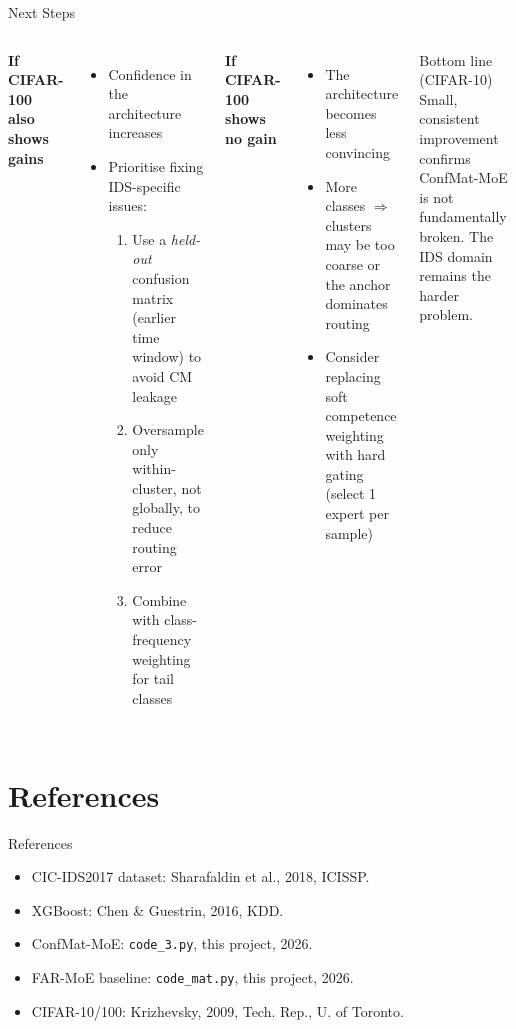 \documentclass[aspectratio=169,10pt]{beamer}
\begin{document}
\begin{frame}{Next Steps}
  \begin{columns}[T]
      \textbf{If CIFAR-100 also shows gains}
      \begin{itemize}\itemsep4pt
        \item Confidence in the architecture increases
        \item Prioritise fixing IDS-specific issues:
          \begin{enumerate}
            \item Use a \emph{held-out} confusion matrix (earlier time window)
                  to avoid CM leakage
            \item Oversample only within-cluster, not globally,
                  to reduce routing error
            \item Combine with class-frequency weighting for tail classes
          \end{enumerate}
      \end{itemize}
      \textbf{If CIFAR-100 shows no gain}
      \begin{itemize}\itemsep4pt
        \item The architecture becomes less convincing
        \item More classes $\Rightarrow$ clusters may be too coarse
              or the anchor dominates routing
        \item Consider replacing soft competence weighting
              with hard gating (select 1 expert per sample)
      \end{itemize}
      \vspace{8pt}
      \begin{block}{Bottom line (CIFAR-10)}
        \small
        Small, consistent improvement confirms ConfMat-MoE
        is not fundamentally broken.
        The IDS domain remains the harder problem.
      \end{block}
  \end{columns}
\end{frame}

\section*{References}

\begin{frame}{References}
  \footnotesize
  \begin{itemize}
    \item CIC-IDS2017 dataset: Sharafaldin et al., 2018, ICISSP.
    \item XGBoost: Chen \& Guestrin, 2016, KDD.
    \item ConfMat-MoE: \texttt{code\_3.py}, this project, 2026.
    \item FAR-MoE baseline: \texttt{code\_mat.py}, this project, 2026.
    \item CIFAR-10/100: Krizhevsky, 2009, Tech. Rep., U. of Toronto.
  \end{itemize}
\end{frame}
\end{document}

